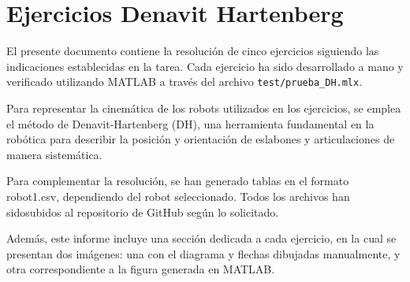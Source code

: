 \section{Ejercicios Denavit Hartenberg}

El presente documento contiene la resolución de cinco ejercicios  siguiendo las indicaciones establecidas en la tarea. Cada ejercicio ha sido desarrollado a mano y verificado utilizando MATLAB a través del archivo \texttt{test/prueba\_DH.mlx}.

Para representar la cinemática de los robots utilizados en los ejercicios, se emplea el método de Denavit-Hartenberg (DH), una herramienta fundamental en la robótica para describir la posición y orientación de eslabones y articulaciones de manera sistemática.

Para complementar la resolución, se han generado tablas en el formato robot1.csv, dependiendo del robot seleccionado. Todos los archivos han sidosubidos al repositorio de GitHub según lo solicitado.

Además, este informe incluye una sección dedicada a cada ejercicio, en la cual se presentan dos imágenes: una con el diagrama y flechas dibujadas manualmente, y otra correspondiente a la figura generada en MATLAB.
